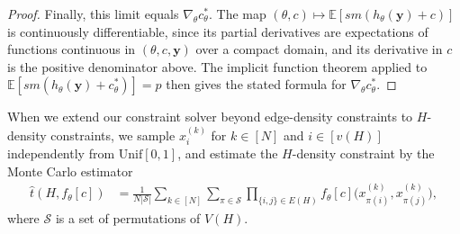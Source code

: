\documentclass{article}
\theoremstyle{plain}
\theoremstyle{definition}
\theoremstyle{remark}
\begin{document}
\begin{proof}
Finally, this limit equals $\nabla_\theta c^*_\theta$. The map $(\theta, c) \mapsto \mathbb{E}[\mathit{sm}(h_\theta(\mathbf{y}) + c)]$ is continuously differentiable, since its partial derivatives are expectations of functions continuous in $(\theta, c, \mathbf{y})$ over a compact domain, and its derivative in $c$ is the positive denominator above. The implicit function theorem applied to $\mathbb{E}[\mathit{sm}(h_\theta(\mathbf{y}) + c^*_\theta)] = p$ then gives the stated formula for $\nabla_\theta c^*_\theta$.
\end{proof}

When we extend our constraint solver beyond edge-density constraints to $H$-density constraints, we sample
$x_{i}^{(k)}$ for $k \in [N]$ and $i \in [v(H)]$ independently from $\mathrm{Unif}[0,1]$, and estimate the $H$-density constraint by the Monte Carlo estimator
\begin{align*}
\widehat{t}(H, f_\theta[c])
&= \frac{1}{N|\mathcal{S}|}
\sum_{k \in [N]}\sum_{\pi \in \mathcal{S}}
\prod_{\{i, j\} \in E(H)} f_\theta[c]\Big(x_{\pi(i)}^{(k)}, x_{\pi(j)}^{(k)}\Big),
\end{align*}
where $\mathcal{S}$ is a set of permutations of $V(H)$. 
\end{document}
